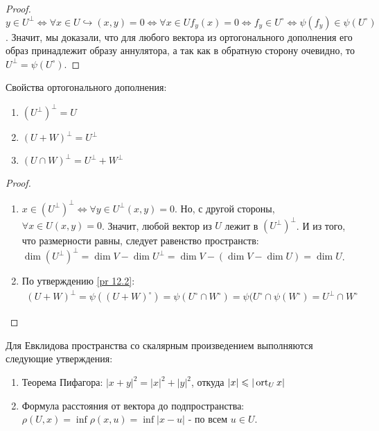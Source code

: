 \begin{proof}
    $y \in U^{\perp} \Leftrightarrow \forall x \in U \hookrightarrow (x, y) = 0 \Leftrightarrow \forall x \in U f_y(x) = 0 \Leftrightarrow f_y \in U^{\circ} \Leftrightarrow \psi(f_y) \in \psi(U^{\circ})$. Значит, мы доказали, что для любого вектора из ортогонального дополнения его образ принадлежит образу аннулятора, а так как в обратную сторону очевидно, то $U^{\perp} = \psi(U^{\circ})$.
\end{proof}

\begin{proposition}
    Свойства ортогонального дополнения:
    \begin{enumerate}
        \item $(U^{\perp})^{\perp} = U$
        \item $(U + W)^{\perp} = U^{\perp}$
        \item $(U \cap W)^{\perp} = U^{\perp} + W^{\perp}$
    \end{enumerate}
\end{proposition}

\begin{proof}
    \begin{enumerate}
        \item $x \in (U^{\perp})^{\perp} \Leftrightarrow \forall y \in U^{\perp} (x, y) = 0$. Но, с другой стороны, $\forall x \in U (x, y) = 0$. Значит, любой вектор из $U$ лежит в $(U^{\perp})^{\perp}$. И из того, что размерности равны, следует равенство пространств: $\dim (U^{\perp})^{\perp} = \dim V - \dim U^{\perp} = \dim V - (\dim V - \dim U) = \dim U$.
        \item По утверждению \ref{pr 12.2}: 
        \begin{gather*}
            (U + W)^{\perp} = \psi((U + W)^{\circ}) = \psi(U^{\circ} \cap W^{\circ}) = \psi(U^{\circ} \cap \psi(W^{\circ}) = U^{\perp} \cap W^{\circ}
        \end{gather*}
    \end{enumerate}
\end{proof}

\begin{note}
    Для Евклидова пространства со скалярным произведением выполняются следующие утверждения:
    \begin{enumerate}
        \item Теорема Пифагора: $|x + y|^2 = |x|^2 + |y|^2$, откуда $|x| \leqslant |\operatorname{ort}_U x|$
        \item Формула расстояния от вектора до подпространства: $\rho (U, x) = \inf \rho (x, u) = \inf |x - u|$ - по всем $u \in U$.
    \end{enumerate}
\end{note}

